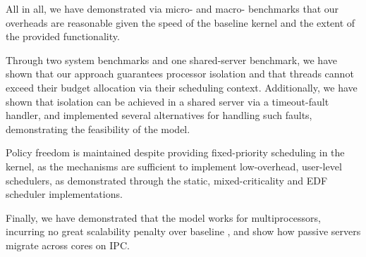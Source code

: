 All in all, we have demonstrated via micro- and macro- benchmarks that our overheads are
reasonable given the speed of the baseline kernel and the extent of the provided
functionality. 

Through two system benchmarks and one shared-server benchmark, we have shown
that our approach guarantees processor isolation and that threads cannot exceed
their budget allocation via their scheduling context. Additionally, we have
shown that isolation can be achieved in a shared server via a timeout-fault
handler, and implemented several alternatives for handling such faults,
demonstrating the feasibility of the model. 

Policy freedom is maintained despite providing fixed-priority scheduling in the kernel, as the
mechanisms are sufficient to implement low-overhead, user-level schedulers, 
as demonstrated through the static, mixed-criticality and EDF scheduler
implementations. 

Finally, we have demonstrated that the model works for multiprocessors,
incurring no great scalability penalty over baseline \selfour, 
and show how passive servers migrate across cores on \gls{IPC}.
